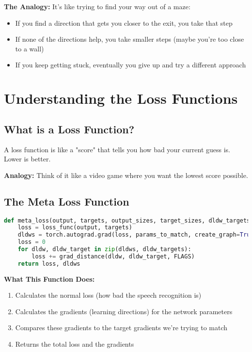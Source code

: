 \documentclass[12pt]{article}
\begin{document}
\textbf{The Analogy:}
It's like trying to find your way out of a maze:
\begin{itemize}
    \item If you find a direction that gets you closer to the exit, you take that step
    \item If none of the directions help, you take smaller steps (maybe you're too close to a wall)
    \item If you keep getting stuck, eventually you give up and try a different approach
\end{itemize}

\section{Understanding the Loss Functions}

\subsection{What is a Loss Function?}

A loss function is like a "score" that tells you how bad your current guess is. Lower is better.

\textbf{Analogy:} Think of it like a video game where you want the lowest score possible.

\subsection{The Meta Loss Function}

\begin{lstlisting}[language=Python, basicstyle=\small]
def meta_loss(output, targets, output_sizes, target_sizes, dldw_targets, params_to_match, loss_func, FLAGS):
    loss = loss_func(output, targets)
    dldws = torch.autograd.grad(loss, params_to_match, create_graph=True)
    loss = 0 
    for dldw, dldw_target in zip(dldws, dldw_targets):
        loss += grad_distance(dldw, dldw_target, FLAGS)
    return loss, dldws
\end{lstlisting}

\textbf{What This Function Does:}
\begin{enumerate}
    \item Calculates the normal loss (how bad the speech recognition is)
    \item Calculates the gradients (learning directions) for the network parameters
    \item Compares these gradients to the target gradients we're trying to match
    \item Returns the total loss and the gradients
\end{enumerate}
\end{document}
